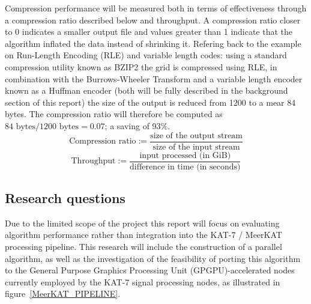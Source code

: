 Compression performance will be measured both in terms of effectiveness through a compression ratio described below \cite[p. 10]{salomon2004data} and throughput. A 
compression ratio closer to 0 indicates a smaller output file and values greater than 1 indicate that the algorithm inflated the data instead of shrinking it. Refering
back to the example on Run-Length Encoding (RLE) and variable length codes: using a standard compression utility known as BZIP2 the grid is compressed using RLE, in combination 
with the Burrows-Wheeler Transform and a variable length encoder known as a Huffman encoder (both will be fully described in the background section of this report) the size 
of the output is reduced from 1200 to a mear 84 bytes. The compression ratio will therefore be computed as $84 \text{ bytes} / 1200 \text{ bytes} = 0.07$; a saving of 93\%. 
\begin{equation}
 \text{Compression ratio} := \frac{\text{size of the output stream}}{\text{size of the input stream}}
\end{equation}
\begin{equation}
 \text{Throughput} := \frac{\text{input processed (in GiB)}}{\text{difference in time (in seconds)}}
\end{equation}
\subsection{Research questions}
Due to the limited scope of the project this report will focus on evaluating algorithm performance rather than integration into the KAT-7 / MeerKAT processing
pipeline. This research will include the construction of a parallel algorithm, as well as the investigation of the feasibility of porting this algorithm to the General 
Purpose Graphics Processing Unit (GPGPU)-accelerated nodes currently employed by the KAT-7 signal processing nodes, as illustrated in figure~\ref{MeerKAT_PIPELINE}.

